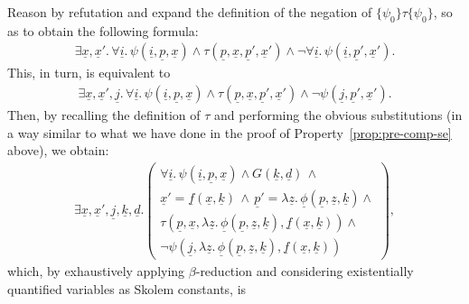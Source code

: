 \documentclass[conference]{IEEEtran}
\begin{document}
\begin{LONG}
\begin{IEEEproof}
  Reason by refutation and expand the definition of the negation of
  $\{ \psi_0\} \tau \{ \psi_0\}$, so as to obtain the following
  formula:
  \begin{eqnarray*}
    \exists \underline{x},\underline{x}'.\,
    \forall \underline{i}.\, \psi(\underline{i},\underline{p},\underline{x}) \wedge
    \tau(\underline{p},\underline{x},\underline{p}',\underline{x}') 
    \wedge
    \neg \forall \underline{i}.\, \psi(\underline{i}, \underline{p}',\underline{x}') .
  \end{eqnarray*}
  This, in turn, is equivalent to
  \begin{eqnarray*}
    \exists \underline{x},\underline{x}', \underline{j}.\,
    \forall \underline{i}.\, \psi(\underline{i},\underline{p},\underline{x}) \wedge
    \tau(\underline{p},\underline{x},\underline{p}',\underline{x}') 
    \wedge
    \neg \psi(\underline{j}, \underline{p}',\underline{x}').
  \end{eqnarray*}
  Then, by recalling the definition of $\tau$ and performing the
  obvious substitutions (in a way similar to what we have done in the
  proof of Property~\ref{prop:pre-comp-se} above), we obtain:
  \begin{eqnarray*}
    \exists \underline{x},\underline{x}', \underline{j}, \underline{k}, \underline{d}.\left(
      \begin{array}{l}
        \forall \underline{i}.\, \psi(\underline{i},\underline{p},\underline{x}) \wedge 
        G(\underline{k}, \underline{d}) \,\wedge\, \\
        \underline{x}' = \underline{f}(\underline{x}, \underline{k})
        \,\wedge\,
        \underline{p}' = \lambda
        \underline{z}.\, \underline{\phi}(\underline{p},\underline{z},\underline{k}) \wedge \\
        \tau(\underline{p},\underline{x},\lambda
        \underline{z}.\, \underline{\phi}(\underline{p},\underline{z},\underline{k}),\underline{f}(\underline{x}, \underline{k})) \wedge \\
        \neg \psi(\underline{j}, 
        \lambda \underline{z}.\,
        \underline{\phi}(\underline{p},\underline{z},\underline{k}),
        \underline{f}(\underline{x}, \underline{k}))
      \end{array} \right) ,
  \end{eqnarray*}
  which, by exhaustively applying $\beta$-reduction and considering
  existentially quantified variables as Skolem constants, is

\end{IEEEproof}
\end{LONG}
\end{document}

